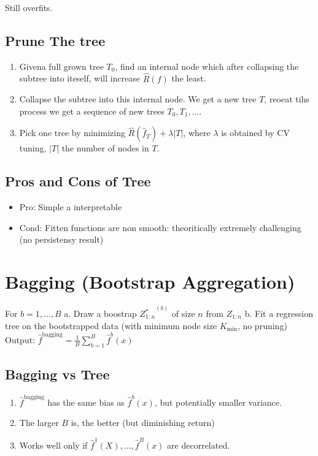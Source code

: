 \documentclass[11pt]{article}
\begin{document}
Still overfits.

\subsection{Prune The tree}
\label{sec:orgheadline1}
\begin{enumerate}
\item Givena full grown tree \(T_0\), find an internal node which after collapsing the subtree into iteself, will increase \(\hat R(f)\) the least.
\item Collapse the subtree into this internal node. We get a new tree \(T\), reoeat tihs process we get a sequence of new trees \(T_0, T_1, \ldots\).
\item Pick one tree by minimizing \(\hat R(\hat f_T) + \lambda |T|\), where \(\lambda\) is obtained by CV tuning, \(|T|\) the number of nodes in \(T\).
\end{enumerate}

\subsection{Pros and Cons of Tree}
\label{sec:orgheadline2}
\begin{itemize}
\item Pro: Simple a interpretable
\item Cond: Fitten functions are non smooth: theoritically extremely challenging (no persistensy result)
\end{itemize}


\section{Bagging (Bootstrap Aggregation)}
\label{sec:orgheadline5}

\begin{algorithm}
For \(b = 1, \ldots, B\)
a. Draw a boostrap \({Z_{1:n}^*}^{(b)}\) of size \(n\) from \(Z_{1:n}\)
b. Fit a regression tree on the bootstrapped data (with minimum node size \(K_{\min}\), no pruning)
Output: \(\hat f^{\text{bagging}} = \frac1B \sum_{b=1}^B \hat f^b(x)\)
\label{orgspecialblock5}

\end{algorithm}
\subsection{Bagging vs Tree}
\label{sec:orgheadline4}
\begin{enumerate}
\item \(\hat f^{\text{bagging}}\) has the same bias as \(\hat f^b(x)\), but potentially smaller variance.
\item The larger \(B\) is, the better (but diminishing return)
\item Works well only if \(\hat f^1(X), \ldots, \hat f^B(x)\) are decorrelated.
\end{enumerate}
\end{document}
